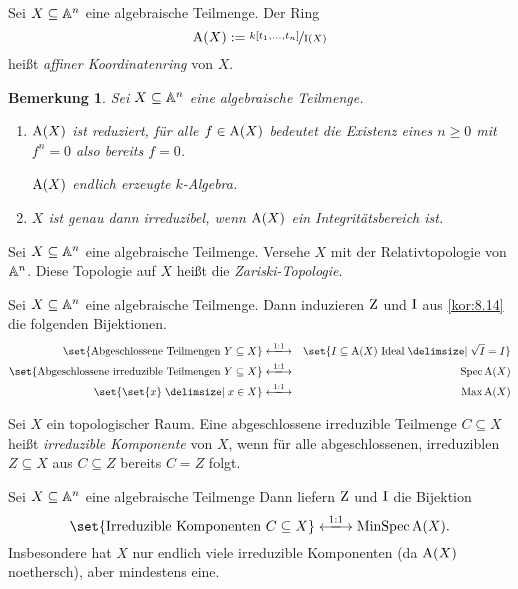 \documentclass[12pt,a4paper]{scrartcl}
\theoremstyle{cplain}
\theoremstyle{cdef}
\newtheorem{beme}[thmcounter]{Bemerkung}
\begin{document}
\begin{defi}
	Sei $X\subseteq \mathbb A^n$ eine algebraische Teilmenge. Der Ring
	\[\operatorname{A}(X) := \nicefrac{k[t_1,\dots, t_n]}{\operatorname{I}(X)}\]
	heißt \emph{affiner Koordinatenring} von $X$.
	
\end{defi}
\begin{beme}
	Sei $X\subseteq \mathbb A^n$ eine algebraische Teilmenge.
	\begin{enumerate}
		\item $\operatorname{A}(X)$ ist \emph{reduziert}, für alle $f\in \operatorname{A}(X)$ bedeutet die Existenz eines $n\ge 0$ mit $f^n = 0$ also bereits $f = 0$.
		
		$\operatorname{A}(X)$ endlich erzeugte $k$-Algebra.
		\item $X$ ist genau dann irreduzibel, wenn $\operatorname{A}(X)$ ein Integritätsbereich ist.
	\end{enumerate}
\end{beme}
\begin{defi}
	Sei $X\subseteq \mathbb A^n$ eine algebraische Teilmenge. Versehe $X$ mit der Relativtopologie von $\mathbb A^n$. Diese Topologie auf $X$ heißt die \emph{Zariski-Topologie}.
\end{defi}
\begin{kor}
	Sei $X\subseteq\mathbb A^n$ eine algebraische Teilmenge. Dann induzieren $\operatorname{Z}$ und $\operatorname{I}$ aus \cref{kor:8.14} die folgenden Bijektionen.
	\begin{eqnarray*}
		\set{\text{Abgeschlossene Teilmengen }Y\subseteq X} &\xlongleftrightarrow{1:1}&\set{I\subseteq \A(X) \text{ Ideal}\given \sqrt{I} = I}\\
		\set{\text{Abgeschlossene irreduzible Teilmengen }Y\subseteq X}&\xlongleftrightarrow{1:1}&\Spec \A(X)\\
		\set{\set{x}\given x\in X}&\xlongleftrightarrow{1:1}&\Max \A(X)
	\end{eqnarray*}
\end{kor}
\begin{defi}
	Sei $X$ ein topologischer Raum. Eine abgeschlossene irreduzible Teilmenge $C\subseteq X$ heißt \emph{irreduzible Komponente} von $X$, wenn für alle abgeschlossenen, irreduziblen $Z\subseteq X$ aus $C\subseteq Z$ bereits $C = Z$ folgt.
\end{defi}
\begin{kor}
	Sei $X\subseteq \mathbb A^n$ eine algebraische Teilmenge Dann liefern $\operatorname{Z}$ und $\operatorname{I}$ die Bijektion
	\[\set{\text{Irreduzible Komponenten }C\subseteq X}\xlongleftrightarrow{1:1} \MinSpec\A(X).\]
	Insbesondere hat $X$ nur endlich viele irreduzible Komponenten (da $\operatorname{A}(X)$ noethersch), aber mindestens eine.
\end{kor}
\end{document}
